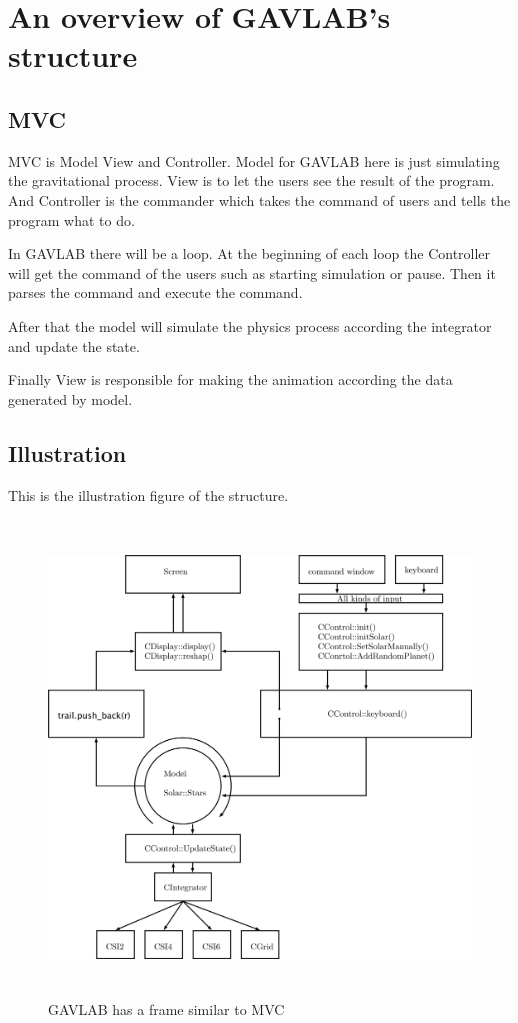 \documentclass[12pt]{article}
\begin{document}
\section{An overview of GAVLAB's structure }
\subsection{MVC}
MVC is Model View and Controller.
Model for GAVLAB here is just simulating the gravitational process.
View is to let the users see the result of the program.
And Controller is the commander which takes the command of users and tells the program what to do.

In GAVLAB there will be a loop.
At the beginning of each loop the Controller will get the command of the users such as starting simulation or pause.
Then it parses the command and execute the command.

After that the model will simulate the physics process according the integrator and update the state.

Finally View is responsible for making the animation according the data generated by model.
\clearpage
\subsection{Illustration}
This is the illustration figure of the structure.
\begin{figure}[H]
\centering
\includegraphics[width=13.2cm,height=12.6cm]{frame.png}
\caption{GAVLAB has a frame similar to MVC}
\end{figure}
\end{document}
